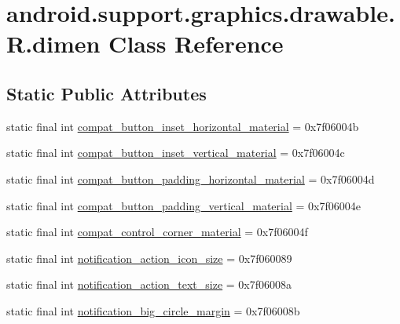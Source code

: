 \hypertarget{classandroid_1_1support_1_1graphics_1_1drawable_1_1_r_1_1dimen}{}\section{android.\+support.\+graphics.\+drawable.\+R.\+dimen Class Reference}
\label{classandroid_1_1support_1_1graphics_1_1drawable_1_1_r_1_1dimen}
\subsection*{Static Public Attributes}
\begin{DoxyCompactItemize}
\item 
static final int \mbox{\hyperlink{classandroid_1_1support_1_1graphics_1_1drawable_1_1_r_1_1dimen_a7f7d527f22e9d8d2ee59187664226463}{compat\+\_\+button\+\_\+inset\+\_\+horizontal\+\_\+material}} = 0x7f06004b
\item 
static final int \mbox{\hyperlink{classandroid_1_1support_1_1graphics_1_1drawable_1_1_r_1_1dimen_a63be3d83c54a095097df721599e48e0d}{compat\+\_\+button\+\_\+inset\+\_\+vertical\+\_\+material}} = 0x7f06004c
\item 
static final int \mbox{\hyperlink{classandroid_1_1support_1_1graphics_1_1drawable_1_1_r_1_1dimen_a4ea17016e6b166cb8ef3bfd1fbb4a7bf}{compat\+\_\+button\+\_\+padding\+\_\+horizontal\+\_\+material}} = 0x7f06004d
\item 
static final int \mbox{\hyperlink{classandroid_1_1support_1_1graphics_1_1drawable_1_1_r_1_1dimen_a2c358fa78e3f83e69efa4829b9d2d94d}{compat\+\_\+button\+\_\+padding\+\_\+vertical\+\_\+material}} = 0x7f06004e
\item 
static final int \mbox{\hyperlink{classandroid_1_1support_1_1graphics_1_1drawable_1_1_r_1_1dimen_a966c908b1fcfad1d3ba12bf14a9814c4}{compat\+\_\+control\+\_\+corner\+\_\+material}} = 0x7f06004f
\item 
static final int \mbox{\hyperlink{classandroid_1_1support_1_1graphics_1_1drawable_1_1_r_1_1dimen_ad7766e60797bfcc0cda3c581b3bbc6b6}{notification\+\_\+action\+\_\+icon\+\_\+size}} = 0x7f060089
\item 
static final int \mbox{\hyperlink{classandroid_1_1support_1_1graphics_1_1drawable_1_1_r_1_1dimen_a12364835fa328aaaacc7102f1964db4d}{notification\+\_\+action\+\_\+text\+\_\+size}} = 0x7f06008a
\item 
static final int \mbox{\hyperlink{classandroid_1_1support_1_1graphics_1_1drawable_1_1_r_1_1dimen_a3fec7894f5b9765aa912a41bce8991a2}{notification\+\_\+big\+\_\+circle\+\_\+margin}} = 0x7f06008b

\end{DoxyCompactItemize}
